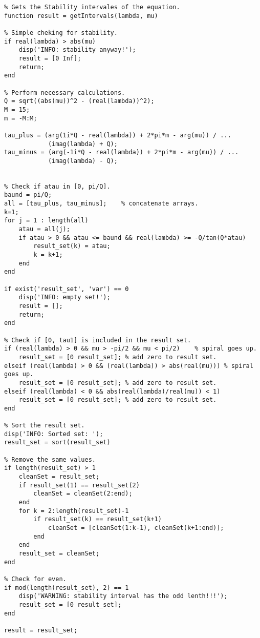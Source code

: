 \begin{verbatim}
% Gets the Stability intervales of the equation.
function result = getIntervals(lambda, mu)

% Simple cheking for stability.
if real(lambda) > abs(mu)
	disp('INFO: stability anyway!');
	result = [0 Inf];
	return;
end

% Perform necessary calculations.
Q = sqrt((abs(mu))^2 - (real(lambda))^2);
M = 15;
m = -M:M;

tau_plus = (arg(1i*Q - real(lambda)) + 2*pi*m - arg(mu)) / ...
			(imag(lambda) + Q);
tau_minus = (arg(-1i*Q - real(lambda)) + 2*pi*m - arg(mu)) / ...
			(imag(lambda) - Q);


% Check if atau in [0, pi/Q].
baund = pi/Q;
all = [tau_plus, tau_minus];	% concatenate arrays.
k=1;
for j = 1 : length(all) 
	atau = all(j); 
	if atau > 0 && atau <= baund && real(lambda) >= -Q/tan(Q*atau)
		result_set(k) = atau;
		k = k+1;
	end
end

if exist('result_set', 'var') == 0
	disp('INFO: empty set!');
	result = [];
	return;
end

% Check if [0, tau1] is included in the result set.
if (real(lambda) > 0 && mu > -pi/2 && mu < pi/2)	% spiral goes up.
	result_set = [0 result_set]; % add zero to result set.
elseif (real(lambda) > 0 && (real(lambda)) > abs(real(mu)))	% spiral goes up.
	result_set = [0 result_set]; % add zero to result set.
elseif (real(lambda) < 0 && abs(real(lambda)/real(mu)) < 1)
	result_set = [0 result_set]; % add zero to result set.		
end

% Sort the result set.
disp('INFO: Sorted set: ');
result_set = sort(result_set)

% Remove the same values.
if length(result_set) > 1
    cleanSet = result_set;
    if result_set(1) == result_set(2)
        cleanSet = cleanSet(2:end);
    end
    for k = 2:length(result_set)-1
        if result_set(k) == result_set(k+1)
            cleanSet = [cleanSet(1:k-1), cleanSet(k+1:end)];
        end
    end
    result_set = cleanSet;
end

% Check for even.
if mod(length(result_set), 2) == 1
    disp('WARNING: stability interval has the odd lenth!!!');
	result_set = [0 result_set];
end

result = result_set;

\end{verbatim}
